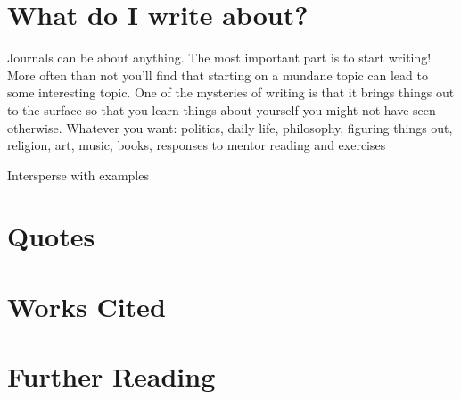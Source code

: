 \section{What do I write about?}

Journals can be about anything. The most important part is to start writing!
More often than not you'll find that starting on a mundane topic can
lead to some interesting topic. One of the
mysteries of writing is that it brings things out to the surface so
that you learn things about yourself you might not have seen otherwise.
Whatever you want: politics, daily life, philosophy, figuring
things out, religion, art, music, books, responses to mentor reading
and exercises


Intersperse with examples

\section{Quotes}

\section{Works Cited}

\section{Further Reading}

